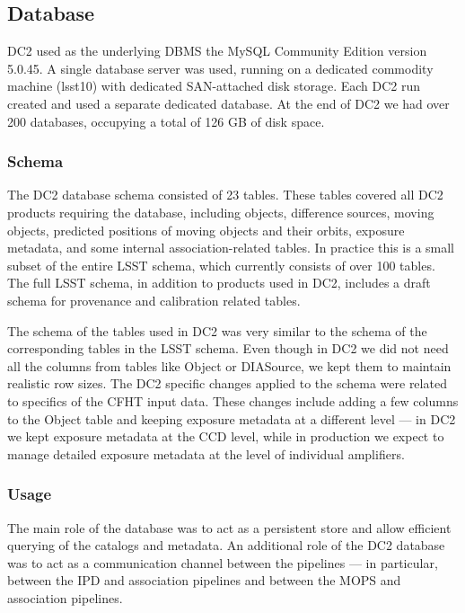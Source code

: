 
\subsection{Database}
\label{database}

DC2 used as the underlying DBMS the MySQL Community Edition version 5.0.45.
A single database server was used, running on a dedicated commodity
machine (lsst10) with dedicated SAN-attached disk storage.
Each DC2 run created and used a separate dedicated database. At the end of DC2 
we had over 200 databases, occupying a total of 126 GB of disk space.

\subsubsection{Schema}

The DC2 database schema consisted of 23 tables. These tables covered
all DC2 products requiring the database, including objects, 
difference sources, moving objects, predicted positions of moving objects 
and their orbits, exposure metadata, and some internal association-related 
tables. In practice this is a small subset of the entire LSST schema, 
which currently consists of over 100 tables. The full LSST schema, 
in addition to products used in DC2, includes a draft schema for provenance 
and calibration related tables.

The schema of the tables used in DC2 was very similar to the schema of the
corresponding tables in the LSST schema. Even though in DC2 we did not 
need all the columns from tables like Object or DIASource, we kept them
to maintain realistic row sizes.
The DC2 specific changes applied to the schema were related to specifics
of the CFHT input data. These changes include adding a few columns to 
the Object table and keeping exposure metadata at a different level ---
in DC2 we kept exposure metadata at the CCD level, while in production we 
expect to manage detailed exposure metadata at the level of individual 
amplifiers. 

\subsubsection{Usage}

The main role of the database was to act as a persistent store and
allow efficient querying of the catalogs and metadata.
An additional role of the DC2 database was to act 
as a communication channel between the pipelines --- in particular,
between the IPD and association pipelines and between the MOPS
and association pipelines.

